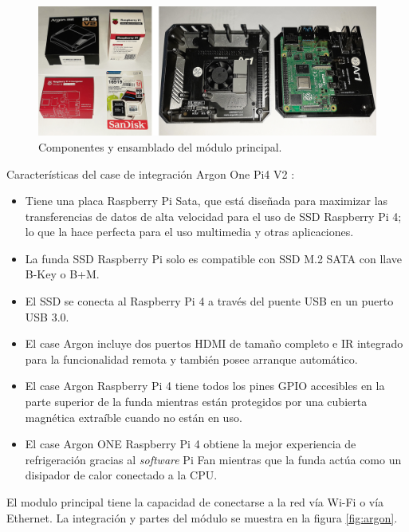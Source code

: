 \begin{figure}[htpb]
\centering 
\includegraphics[width=1.0\textwidth]{./Figures/m1-2.jpg}
\caption{Componentes y ensamblado del módulo principal.}
\label{fig:armado}
\end{figure}

\vspace{0.5cm}
Características del case de integración Argon One Pi4 V2 \citep{WEBSITE:16}:

\begin{itemize}
\item Tiene una placa Raspberry Pi Sata, que está diseñada para maximizar las transferencias de datos de alta velocidad para el uso de SSD Raspberry Pi 4; lo que la hace perfecta para el uso multimedia y otras aplicaciones. 
\item La funda SSD Raspberry Pi solo es compatible con SSD M.2 SATA con llave B-Key o B+M.
\item El SSD se conecta al Raspberry Pi 4 a través del puente USB en un puerto USB 3.0. 
\item El case Argon incluye dos puertos HDMI de tamaño completo e IR integrado para la funcionalidad remota y también posee arranque automático. 
\item El case Argon Raspberry Pi 4 tiene todos los pines GPIO accesibles en la parte superior de la funda mientras están protegidos por una cubierta magnética extraíble cuando no están en uso. 
\item El case Argon ONE Raspberry Pi 4 obtiene la mejor experiencia de refrigeración gracias al \emph{software} Pi Fan mientras que la funda actúa como un disipador de calor conectado a la CPU.
\end{itemize}

El modulo principal tiene la capacidad de conectarse a la red vía Wi-Fi o vía Ethernet. La integración y partes del módulo se muestra en la figura \ref{fig:argon}.



